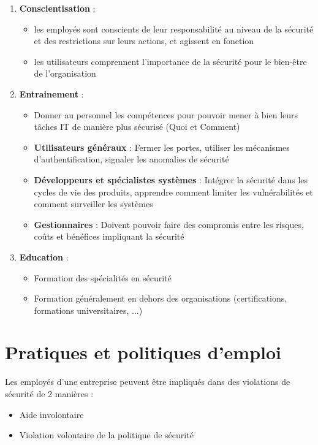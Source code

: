 \documentclass{report}
\begin{document}
\begin{enumerate}
    \item \textbf{Conscientisation} :
    \begin{itemize}
        \item les employés sont conscients de leur responsabilité au niveau de la sécurité et des restrictions sur leurs actions, et agissent en fonction
        \item les utilisateurs comprennent l'importance de la sécurité pour le bien-être de l'organisation
    \end{itemize}

    \item \textbf{Entrainement} :
    \begin{itemize}
        \item Donner au personnel les compétences pour pouvoir mener à bien leurs tâches IT de manière plus sécurisé (Quoi et Comment)
        \item \textbf{Utilisateurs généraux} : Fermer les portes, utiliser les mécanismes d'authentification, signaler les anomalies de sécurité
        \item \textbf{Développeurs et spécialistes systèmes} : Intégrer la sécurité dans les cycles de vie des produits, apprendre comment limiter les vulnérabilités et comment surveiller les systèmes
        \item \textbf{Gestionnaires} : Doivent pouvoir faire des compromis entre les risques, coûts et bénéfices impliquant la sécurité
    \end{itemize}

    \item \textbf{Education} :
    \begin{itemize}
        \item Formation des spécialités en sécurité
        \item Formation généralement en dehors des organisations (certifications, formations universitaires, ...)
    \end{itemize}
\end{enumerate}

\section{Pratiques et politiques d'emploi}

Les employés d'une entreprise peuvent être impliqués dans des violations de sécurité de 2 manières :
\begin{itemize}
    \item Aide involontaire
    \item Violation volontaire de la politique de sécurité
\end{itemize}~
\end{document}
